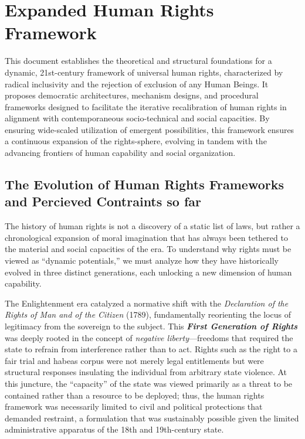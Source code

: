 \section{Expanded Human Rights Framework}\label{expanded-human-rights-framework}

This document establishes the theoretical and structural foundations for
a dynamic, 21st-century framework of universal human rights,
characterized by radical inclusivity and the rejection of exclusion of
any Human Beings. It proposes democratic architectures, mechanism
designs, and procedural frameworks designed to facilitate the iterative
recalibration of human rights in alignment with contemporaneous
socio-technical and social capacities. By ensuring wide-scaled
utilization of emergent possibilities, this framework ensures a
continuous expansion of the rights-sphere, evolving in tandem with the
advancing frontiers of human capability and social organization.

\subsection{The Evolution of Human Rights Frameworks and Percieved
Contraints so
far}\label{the-evolution-of-human-rights-frameworks-and-percieved-contraints-so-far}

The history of human rights is not a discovery of a static list of laws,
but rather a chronological expansion of moral imagination that has
always been tethered to the material and social capacities of the era.
To understand why rights must be viewed as ``dynamic potentials,'' we
must analyze how they have historically evolved in three distinct
generations, each unlocking a new dimension of human capability.

The Enlightenment era catalyzed a normative shift with the
\emph{Declaration of the Rights of Man and of the Citizen} (1789),
fundamentally reorienting the locus of legitimacy from the sovereign to
the subject. This \textbf{\emph{First Generation of Rights}} was deeply
rooted in the concept of \emph{negative liberty}---freedoms that
required the state to refrain from interference rather than to act.
Rights such as the right to a fair trial and habeas corpus were not
merely legal entitlements but were structural responses insulating the
individual from arbitrary state violence. At this juncture, the
``capacity'' of the state was viewed primarily as a threat to be
contained rather than a resource to be deployed; thus, the human rights
framework was necessarily limited to civil and political protections
that demanded restraint, a formulation that was sustainably possible
given the limited administrative apparatus of the 18th and 19th-century
state.

